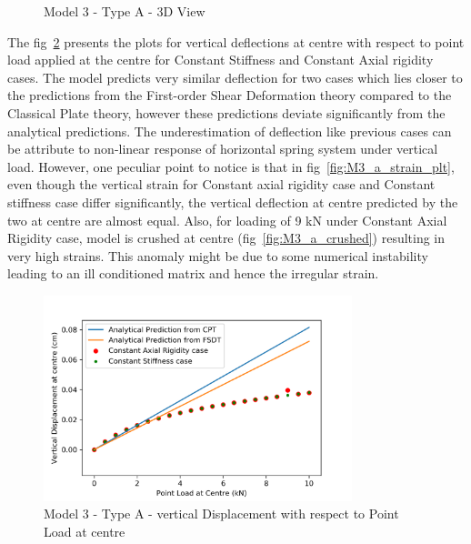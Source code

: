 \begin{figure}[!htbp]
\begin{minipage}{0.3\textwidth}
    \caption{Model 3 - Type A - 3D View}
    \label{fig:M3_a_3D}
\end{minipage}
\end{figure}

The fig~\ref{fig:M3_a_plt} presents the plots for vertical deflections at centre with respect to point load applied at the centre for Constant Stiffness and Constant Axial rigidity cases. The model predicts very similar deflection for two cases which lies closer to the predictions from the First-order Shear Deformation theory compared to the Classical Plate theory, however these predictions deviate significantly from the analytical predictions. The underestimation of deflection like previous cases can be attribute to non-linear response of horizontal spring system under vertical load. However, one peculiar point to notice is that in fig~\ref{fig:M3_a_strain_plt}, even though the vertical strain for Constant axial rigidity case and Constant stiffness case differ significantly, the vertical deflection at centre predicted by the two at centre are almost equal. Also, for loading of 9 kN under Constant Axial Rigidity case, model is crushed at centre (fig~\ref{fig:M3_a_crushed}) resulting in very high strains. This anomaly might be due to some numerical instability leading to an ill conditioned matrix and hence the irregular strain.

\begin{figure}[!htbp]
    \centering
    \includegraphics[width = 0.8\textwidth]{Figures/M3_a_plt.png}
    \caption{Model 3 - Type A - vertical Displacement with respect to Point Load at centre}
    \label{fig:M3_a_plt}
\end{figure}

